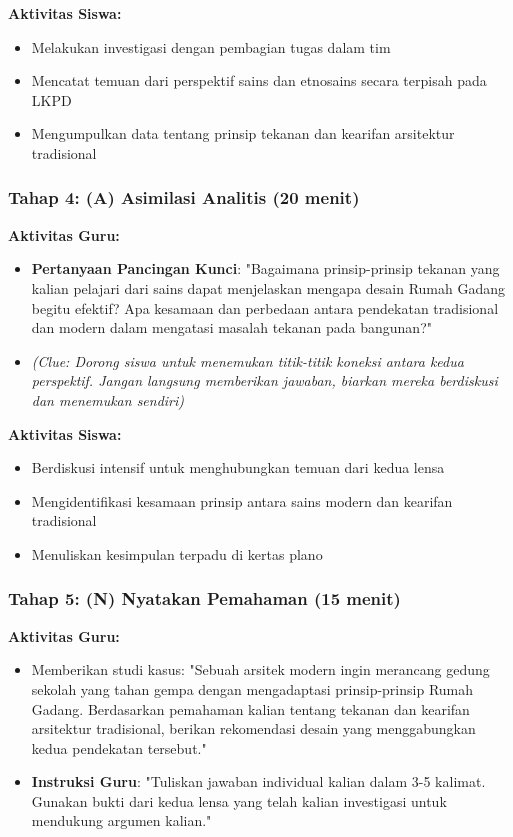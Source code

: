 \documentclass[12pt,a4paper]{article}
\begin{document}
\textbf{Aktivitas Siswa:}
\begin{itemize}
\item Melakukan investigasi dengan pembagian tugas dalam tim
\item Mencatat temuan dari perspektif sains dan etnosains secara terpisah pada LKPD
\item Mengumpulkan data tentang prinsip tekanan dan kearifan arsitektur tradisional
\end{itemize}

\subsubsection{Tahap 4: (A) Asimilasi Analitis (20 menit)}

\textbf{Aktivitas Guru:}
\begin{itemize}
\item \textbf{Pertanyaan Pancingan Kunci}: "Bagaimana prinsip-prinsip tekanan yang kalian pelajari dari sains dapat menjelaskan mengapa desain Rumah Gadang begitu efektif? Apa kesamaan dan perbedaan antara pendekatan tradisional dan modern dalam mengatasi masalah tekanan pada bangunan?"
\item \textit{(Clue: Dorong siswa untuk menemukan titik-titik koneksi antara kedua perspektif. Jangan langsung memberikan jawaban, biarkan mereka berdiskusi dan menemukan sendiri)}
\end{itemize}

\textbf{Aktivitas Siswa:}
\begin{itemize}
\item Berdiskusi intensif untuk menghubungkan temuan dari kedua lensa
\item Mengidentifikasi kesamaan prinsip antara sains modern dan kearifan tradisional
\item Menuliskan kesimpulan terpadu di kertas plano
\end{itemize}

\subsubsection{Tahap 5: (N) Nyatakan Pemahaman (15 menit)}

\textbf{Aktivitas Guru:}
\begin{itemize}
\item Memberikan studi kasus: "Sebuah arsitek modern ingin merancang gedung sekolah yang tahan gempa dengan mengadaptasi prinsip-prinsip Rumah Gadang. Berdasarkan pemahaman kalian tentang tekanan dan kearifan arsitektur tradisional, berikan rekomendasi desain yang menggabungkan kedua pendekatan tersebut."
\item \textbf{Instruksi Guru}: "Tuliskan jawaban individual kalian dalam 3-5 kalimat. Gunakan bukti dari kedua lensa yang telah kalian investigasi untuk mendukung argumen kalian."
\end{itemize}
\end{document}
